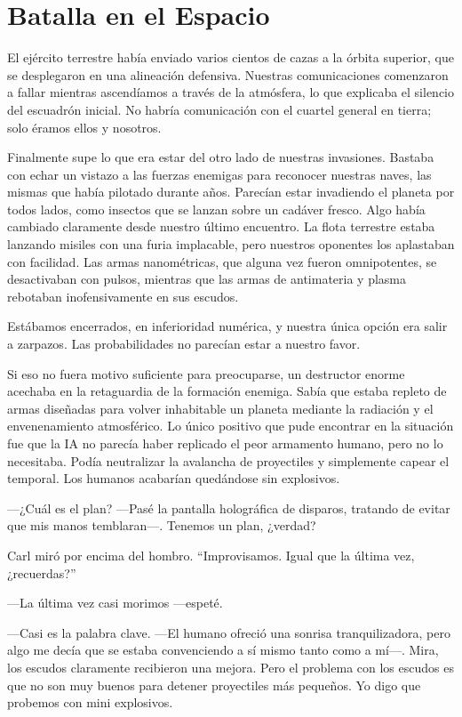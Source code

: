 \chapter{Batalla en el Espacio}\label{sec:batalla-en-el-espacio}

El ejército terrestre había enviado varios cientos de cazas a la órbita superior, que se desplegaron en una alineación defensiva. Nuestras comunicaciones comenzaron a fallar mientras ascendíamos a través de la atmósfera, lo que explicaba el silencio del escuadrón inicial. No habría comunicación con el cuartel general en tierra; solo éramos ellos y nosotros.

Finalmente supe lo que era estar del otro lado de nuestras invasiones. Bastaba con echar un vistazo a las fuerzas enemigas para reconocer nuestras naves, las mismas que había pilotado durante años. Parecían estar invadiendo el planeta por todos lados, como insectos que se lanzan sobre un cadáver fresco. Algo había cambiado claramente desde nuestro último encuentro. La flota terrestre estaba lanzando misiles con una furia implacable, pero nuestros oponentes los aplastaban con facilidad. Las armas nanométricas, que alguna vez fueron omnipotentes, se desactivaban con pulsos, mientras que las armas de antimateria y plasma rebotaban inofensivamente en sus escudos.

Estábamos encerrados, en inferioridad numérica, y nuestra única opción era salir a zarpazos. Las probabilidades no parecían estar a nuestro favor.

Si eso no fuera motivo suficiente para preocuparse, un destructor enorme acechaba en la retaguardia de la formación enemiga. Sabía que estaba repleto de armas diseñadas para volver inhabitable un planeta mediante la radiación y el envenenamiento atmosférico. Lo único positivo que pude encontrar en la situación fue que la IA no parecía haber replicado el peor armamento humano, pero no lo necesitaba. Podía neutralizar la avalancha de proyectiles y simplemente capear el temporal. Los humanos acabarían quedándose sin explosivos.

—¿Cuál es el plan? —Pasé la pantalla holográfica de disparos, tratando de evitar que mis manos temblaran—. Tenemos un plan, ¿verdad?

Carl miró por encima del hombro. ``Improvisamos. Igual que la última vez, ¿recuerdas?''


—La última vez casi morimos —espeté.

—Casi es la palabra clave. —El humano ofreció una sonrisa tranquilizadora, pero algo me decía que se estaba convenciendo a sí mismo tanto como a mí—. Mira, los escudos claramente recibieron una mejora. Pero el problema con los escudos es que no son muy buenos para detener proyectiles más pequeños. Yo digo que probemos con mini explosivos.

